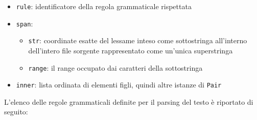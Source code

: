 \documentclass{article}
\begin{document}
    \begin{itemize}
        \item \texttt{rule}: identificatore della regola grammaticale rispettata
        \item \texttt{span}:
        \begin{itemize}
            \item \texttt{str}: coordinate esatte del lessame inteso come sottostringa all'interno dell'intero file sorgente rappresentato come un'unica superstringa
            \item \texttt{range}: il range occupato dai caratteri della sottostringa
        \end{itemize}
        \item \texttt{inner}: lista ordinata di elementi figli, quindi altre istanze di \texttt{Pair}
    \end{itemize}

    L'elenco delle regole grammaticali definite per il parsing del testo è riportato di seguito:
\end{document}

